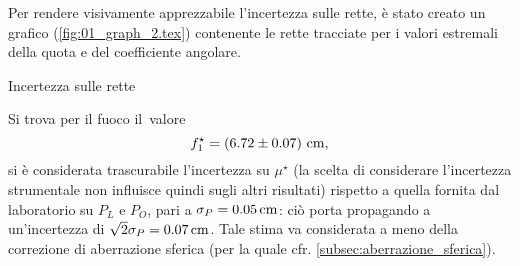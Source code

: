Per rendere visivamente apprezzabile l'incertezza sulle rette, \`e stato creato un grafico (\autoref{fig:01_graph_2.tex}) contenente le rette tracciate per i valori estremali della quota e del coefficiente angolare.
\begin{grafico} \centering  \caption{Incertezza sulle rette} \label{fig:01_graph_2.tex} \end{grafico}
%
Si trova per il fuoco il~valore 
\[ f^{\star}_1=\left(6.72 \pm 0.07\right) \,\mathrm{cm} , \] 
si \`e considerata trascurabile l'incertezza su $\mu^{\star}$ (la scelta di considerare l'incertezza strumentale non influisce quindi sugli altri risultati) rispetto a quella fornita dal laboratorio su $P_L$ e $P_O$, pari a $\sigma _P = 0.05 \,\mathrm{cm}$: ci\`o porta propagando a un'incertezza di $\sqrt{2}   \sigma_P = 0.07 \,\mathrm{cm}$. Tale stima va considerata a meno della correzione di aberrazione sferica (per la quale cfr. \autoref{subsec:aberrazione_sferica}).

